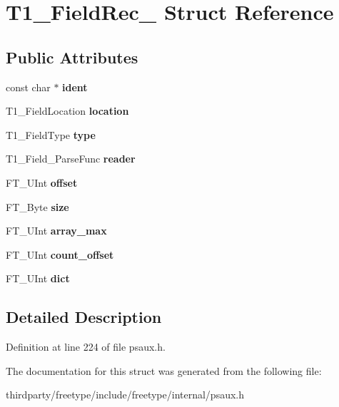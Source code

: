 \hypertarget{struct_t1___field_rec__}{}\section{T1\+\_\+\+Field\+Rec\+\_\+ Struct Reference}
\label{struct_t1___field_rec__}
\subsection*{Public Attributes}
\begin{DoxyCompactItemize}
\item 
\mbox{\label{struct_t1___field_rec___aaf70ae870eff9ea2b0518ef5e7301cfd}} 
const char $\ast$ {\bfseries ident}
\item 
\mbox{\label{struct_t1___field_rec___a1e17111c68df523f82d20bddd822ca4d}} 
T1\+\_\+\+Field\+Location {\bfseries location}
\item 
\mbox{\label{struct_t1___field_rec___ad873155b36b72db9a1feaf2699fed1ce}} 
T1\+\_\+\+Field\+Type {\bfseries type}
\item 
\mbox{\label{struct_t1___field_rec___a95e227de47c22bdadd77f797ff43d89d}} 
T1\+\_\+\+Field\+\_\+\+Parse\+Func {\bfseries reader}
\item 
\mbox{\label{struct_t1___field_rec___a41b503016f68291e061a2e29498982c1}} 
F\+T\+\_\+\+U\+Int {\bfseries offset}
\item 
\mbox{\label{struct_t1___field_rec___a8ce74a7ad2276abe8942883e7fbb1241}} 
F\+T\+\_\+\+Byte {\bfseries size}
\item 
\mbox{\label{struct_t1___field_rec___a87f063bd3ad0dcfa30c00946d9f9cae8}} 
F\+T\+\_\+\+U\+Int {\bfseries array\+\_\+max}
\item 
\mbox{\label{struct_t1___field_rec___a41d8814cc651d0276f8cfad751721326}} 
F\+T\+\_\+\+U\+Int {\bfseries count\+\_\+offset}
\item 
\mbox{\label{struct_t1___field_rec___a509f7ddb1e0ffe050017daa29223e224}} 
F\+T\+\_\+\+U\+Int {\bfseries dict}
\end{DoxyCompactItemize}


\subsection{Detailed Description}


Definition at line 224 of file psaux.\+h.



The documentation for this struct was generated from the following file\+:\begin{DoxyCompactItemize}
\item 
thirdparty/freetype/include/freetype/internal/psaux.\+h\end{DoxyCompactItemize}
